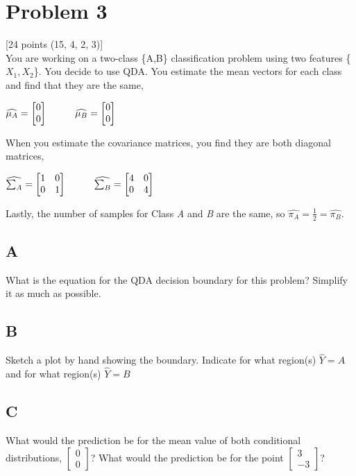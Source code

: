 \documentclass[12pt]{article}
\newcommand\tab[1][1cm]{\hspace*{#1}}
\begin{document}
\section{Problem 3}
 [24 points (15, 4, 2, 3)]\\
You are working on a two-class \{A,B\} classification problem using two features \{$X_1, X_2$\}. You decide to use QDA. You estimate the mean vectors for each class and find that they are the same,
\begin{center}
    $
        \widehat{\mu_A} = \begin{bmatrix}
            0 \\ 0
        \end{bmatrix}
        \tab
        \widehat{\mu_B} = \begin{bmatrix}
            0 \\ 0
        \end{bmatrix}
    $
\end{center}
When you estimate the covariance matrices, you find they are both diagonal matrices,
\begin{center}
    $
        \widehat{\sum_A} = \begin{bmatrix}
            1 & 0 \\
            0 & 1
        \end{bmatrix}
        \tab
        \widehat{\sum_B} = \begin{bmatrix}
            4 & 0 \\
            0 & 4
        \end{bmatrix}
    $
\end{center}
Lastly, the number of samples for Class \emph{A} and \emph{B} are the same, so $\widehat{\pi_A} = \frac{1}{2} = \widehat{\pi_B}$.

\subsection{A}
What is the equation for the QDA decision boundary for this problem? Simplify it as much as possible.


\subsection{B}
Sketch a plot by hand showing the boundary. Indicate for what region(s) $\hat{Y} = A$ and for what region(s) $\hat{Y} = B$


\subsection{C}
What would the prediction be for the mean value of both conditional distributions, $\begin{bmatrix}0 \\ 0\end{bmatrix}$? What would the prediction be for the point $\begin{bmatrix}3 \\ -3\end{bmatrix}$?
\end{document}
